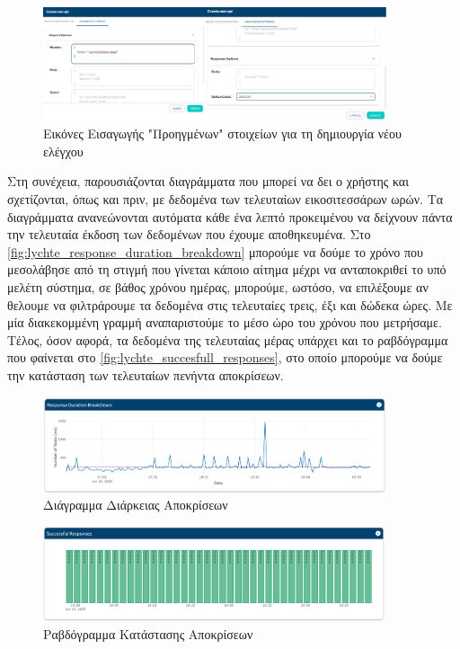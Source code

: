 \begin{figure}[!ht]
	\centering
	\includegraphics[width=0.9\textwidth]{./images/chapter5/api_creation_advanced.png}
	\caption[Εικόνες Εισαγωγής "Προηγμένων" στοιχείων για τη δημιουργία νέου ελέγχου]{Εικόνες Εισαγωγής "Προηγμένων" στοιχείων για τη δημιουργία νέου ελέγχου}
	\label{fig:lychte_advanced_api_creation}
\end{figure}

\clearpage

Στη συνέχεια, παρουσιάζονται διαγράμματα που μπορεί να δει ο χρήστης και σχετίζονται, όπως και πριν, με δεδομένα
των τελευταίων εικοσιτεσσάρων ωρών. Τα διαγράμματα ανανεώνονται αυτόματα κάθε ένα λεπτό προκειμένου να δείχνουν
πάντα την τελευταία έκδοση των δεδομένων που έχουμε αποθηκευμένα. Στο \autoref{fig:lychte_response_duration_breakdown}
μπορούμε να δούμε το χρόνο που μεσολάβησε από τη στιγμή που γίνεται κάποιο αίτημα μέχρι να ανταποκριθεί το υπό μελέτη
σύστημα, σε βάθος χρόνου ημέρας, μπορούμε, ωστόσο, να επιλέξουμε αν θελουμε να φιλτράρουμε τα δεδομένα στις τελευταίες τρεις, έξι και δώδεκα ώρες.
Με μία διακεκομμένη γραμμή αναπαριστούμε το μέσο ώρο του χρόνου που μετρήσαμε. Τέλος, όσον αφορά, τα δεδομένα της τελευταίας μέρας
υπάρχει και το ραβδόγραμμα που φαίνεται στο \autoref{fig:lychte_succesfull_responses}, στο οποίο μπορούμε να δούμε την κατάσταση των τελευταίων
πενήντα αποκρίσεων.\\

\begin{figure}[!ht]
	\centering
	\includegraphics[width=0.9\textwidth]{./images/chapter5/response_duration_breakdown.png}
	\caption[Διάγραμμα Διάρκειας Αποκρίσεων]{Διάγραμμα Διάρκειας Αποκρίσεων}
	\label{fig:lychte_response_duration_breakdown}
\end{figure}	
\begin{figure}[!ht]
	\centering
	\includegraphics[width=0.9\textwidth]{./images/chapter5/succesfull_responses.png}
	\caption[Ραβδόγραμμα Κατάστασης Αποκρίσεων]{Ραβδόγραμμα Κατάστασης Αποκρίσεων}
	\label{fig:lychte_succesfull_responses}
\end{figure}

